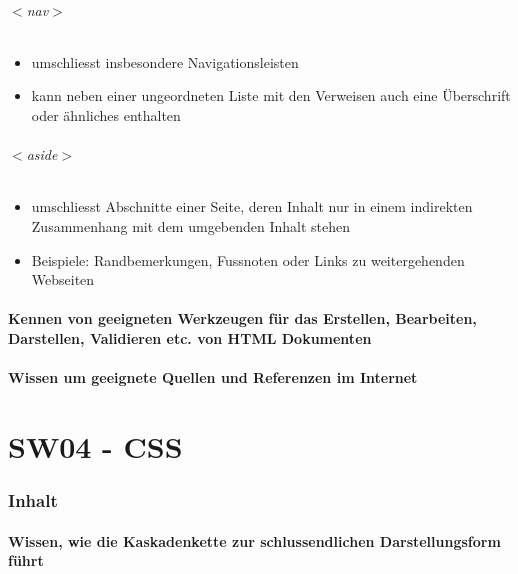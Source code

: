 \documentclass[10pt,a4paper]{article}
\begin{document}
\paragraph{$<$nav$>$}
\begin{itemize}[noitemsep,topsep=0pt,leftmargin=*]
    \item umschliesst insbesondere Navigationsleisten
    \item kann neben einer ungeordneten Liste mit den Verweisen auch eine Überschrift oder ähnliches enthalten
\end{itemize}

\paragraph{$<$aside$>$}
\begin{itemize}[noitemsep,topsep=0pt,leftmargin=*]
    \item umschliesst Abschnitte einer Seite, deren Inhalt nur in einem indirekten Zusammenhang mit dem umgebenden Inhalt stehen
    \item Beispiele: Randbemerkungen, Fussnoten oder Links zu weitergehenden Webseiten
\end{itemize}


\subsection{Kennen von \textbf{geeigneten Werkzeugen} für das Erstellen, Bearbeiten, Darstellen, Validieren etc. von HTML Dokumenten}

\subsection{Wissen um geeignete \textbf{Quellen und Referenzen} im Internet}

\part{SW04 - CSS}
\section{Inhalt}
\subsection{Wissen, wie die \textbf{Kaskadenkette} zur schlussendlichen Darstellungsform führt}
\end{document}
